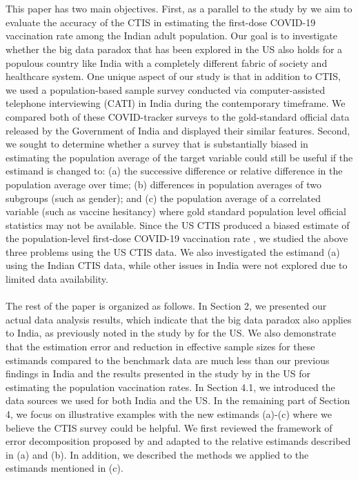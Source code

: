 \documentclass{article}
\begin{document}
\\
\\
This paper has two main objectives. First, as a parallel to the study by \cite{Bradley2021-io} we aim to evaluate the accuracy of the CTIS in estimating the first-dose COVID-19 vaccination rate among the Indian adult population. Our goal is to investigate whether the big data paradox that has been explored in the US also holds for a populous country like India with a completely different fabric of society and healthcare system. One unique aspect of our study is that in addition to CTIS, we used a population-based sample survey conducted via computer-assisted telephone interviewing (CATI) in India during the contemporary timeframe. We compared both of these COVID-tracker surveys to the gold-standard official data released by the Government of India and displayed their similar features. Second, we sought to determine whether a survey that is substantially biased in estimating the population average of the target variable could still be useful if the estimand is changed to: (a) the successive difference or relative difference in the population average over time; (b) differences in population averages of two subgroups (such as gender); and (c) the population average of a correlated variable (such as vaccine hesitancy) where gold standard population level official statistics may not be available. Since the US CTIS produced a biased estimate of the population-level first-dose COVID-19 vaccination rate \citep{Bradley2021-io}, we studied the above three problems using the US CTIS data. We also investigated the estimand (a) using the Indian CTIS data, while other issues in India were not explored due to limited data availability.
\\
\\
The rest of the paper is organized as follows. In Section 2, we presented our actual data analysis results, which indicate that the big data paradox also applies to India, as previously noted in the study by \cite{Bradley2021-io} for the US. We also demonstrate that the estimation error and reduction in effective sample sizes for these estimands compared to the benchmark data are much less than our previous findings in India and the results presented in the study by \cite{Bradley2021-io} in the US for estimating the population vaccination rates. In Section 4.1, we introduced the data sources we used for both India and the US. In the remaining part of Section 4, we focus on illustrative examples with the new estimands (a)-(c) where we believe the CTIS survey could be helpful. We first reviewed the framework of error decomposition proposed by \cite{Meng2018} and adapted to the relative estimands described in (a) and (b). In addition, we described the methods we applied to the estimands mentioned in (c). 
\end{document}
